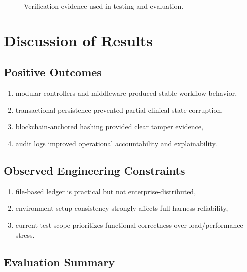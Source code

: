 \documentclass[12pt,a4paper]{report}
\begin{document}
\begin{figure}[H]
\centering
{}
\caption{Verification evidence used in testing and evaluation.}
\label{fig:blockchain-verification-evidence}
\end{figure}

\section{Discussion of Results}

\subsection{Positive Outcomes}

\begin{enumerate}
\item modular controllers and middleware produced stable workflow behavior,
\item transactional persistence prevented partial clinical state corruption,
\item blockchain-anchored hashing provided clear tamper evidence,
\item audit logs improved operational accountability and explainability.
\end{enumerate}

\subsection{Observed Engineering Constraints}

\begin{enumerate}
\item file-based ledger is practical but not enterprise-distributed,
\item environment setup consistency strongly affects full harness reliability,
\item current test scope prioritizes functional correctness over load/performance stress.
\end{enumerate}

\subsection{Evaluation Summary}
\end{document}
